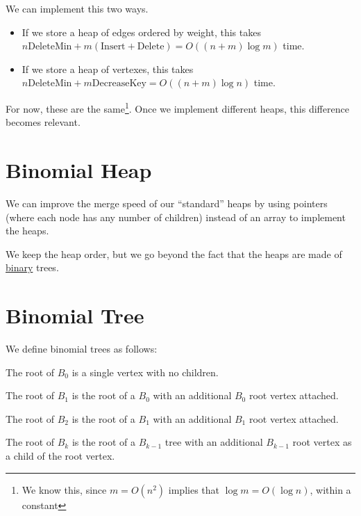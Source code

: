                 We can implement this two ways.
                \begin{itemize}
                    \item If we store a heap of edges ordered by weight, this takes $n\text{DeleteMin} + m(\text{Insert} + \text{Delete}) = O((n+m) \log m)$ time.
                    \item If we store a heap of vertexes, this takes $n \text{DeleteMin} + m \text{DecreaseKey} = O((n+m) \log n)$ time.
                \end{itemize}
                For now, these are the same\footnote{We know this, since $m = O(n^2)$ implies that $\log m = O(\log n)$, within a constant}.
                Once we implement different heaps, this difference becomes relevant.
            \section{Binomial Heap} %
            \label{sec:binomial_heap}
                We can improve the merge speed of our ``standard'' heaps by using pointers (where each node has any number of children) instead of an array to implement the heaps.

                We keep the heap order, but we go beyond the fact that the heaps are made of \uline{binary} trees.
            \section{Binomial Tree} %
            \label{sec:binomial_tree}
                We define binomial trees as follows:

                The root of $B_0$ is a single vertex with no children.

                The root of $B_1$ is the root of a $B_0$ with an additional $B_0$ root vertex attached.

                The root of $B_2$ is the root of a $B_1$ with an additional $B_1$ root vertex attached.

                The root of $B_k$ is the root of a $B_{k-1}$ tree with an additional $B_{k-1}$ root vertex as a child of the root vertex.

